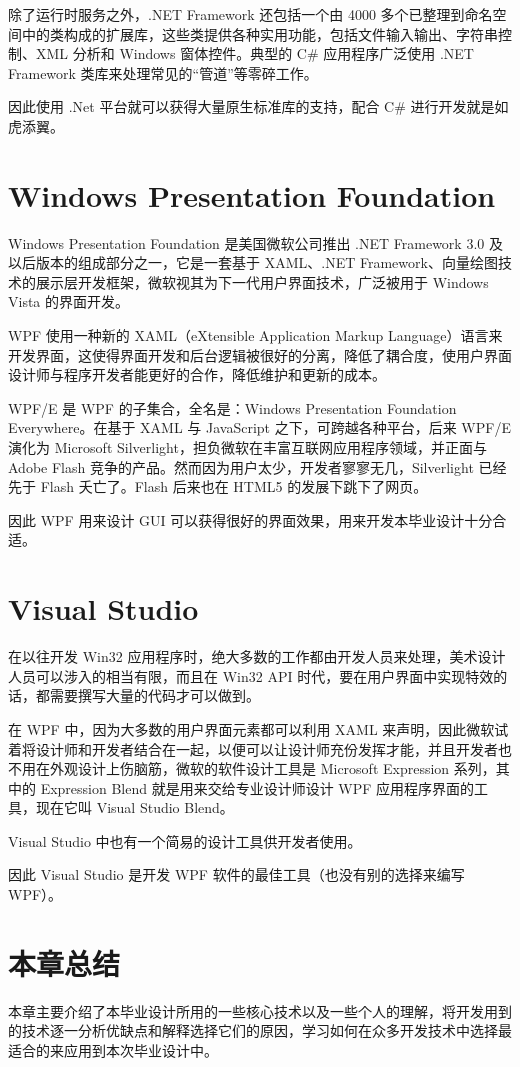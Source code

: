 除了运行时服务之外，.NET Framework 还包括一个由 4000 多个已整理到命名空间中的类构成的扩展库，这些类提供各种实用功能，包括文件输入输出、字符串控制、XML 分析和 Windows 窗体控件。典型的 C\# 应用程序广泛使用 .NET Framework 类库来处理常见的``管道''等零碎工作。

因此使用 .Net 平台就可以获得大量原生标准库的支持，配合 C\# 进行开发就是如虎添翼。

\section{Windows Presentation Foundation}

Windows Presentation Foundation 是美国微软公司推出 .NET Framework 3.0 及以后版本的组成部分之一，它是一套基于 XAML、.NET Framework、向量绘图技术的展示层开发框架，微软视其为下一代用户界面技术，广泛被用于 Windows Vista 的界面开发。

WPF 使用一种新的 XAML（eXtensible Application Markup Language）语言来开发界面，这使得界面开发和后台逻辑被很好的分离，降低了耦合度，使用户界面设计师与程序开发者能更好的合作，降低维护和更新的成本。

WPF/E 是 WPF 的子集合，全名是：Windows Presentation Foundation Everywhere。在基于 XAML 与 JavaScript 之下，可跨越各种平台，后来 WPF/E 演化为 Microsoft Silverlight，担负微软在丰富互联网应用程序领域，并正面与 Adobe Flash 竞争的产品。然而因为用户太少，开发者寥寥无几，Silverlight 已经先于 Flash 夭亡了。Flash 后来也在 HTML5 的发展下跳下了网页。

因此 WPF 用来设计 GUI 可以获得很好的界面效果，用来开发本毕业设计十分合适。

\section{Visual Studio}

在以往开发 Win32 应用程序时，绝大多数的工作都由开发人员来处理，美术设计人员可以涉入的相当有限，而且在 Win32 API 时代，要在用户界面中实现特效的话，都需要撰写大量的代码才可以做到。

在 WPF 中，因为大多数的用户界面元素都可以利用 XAML 来声明，因此微软试着将设计师和开发者结合在一起，以便可以让设计师充份发挥才能，并且开发者也不用在外观设计上伤脑筋，微软的软件设计工具是 Microsoft Expression 系列，其中的 Expression Blend 就是用来交给专业设计师设计 WPF 应用程序界面的工具，现在它叫 Visual Studio Blend。

Visual Studio 中也有一个简易的设计工具供开发者使用。

因此 Visual Studio 是开发 WPF 软件的最佳工具（也没有别的选择来编写 WPF）。

\section{本章总结}

本章主要介绍了本毕业设计所用的一些核心技术以及一些个人的理解，将开发用到的技术逐一分析优缺点和解释选择它们的原因，学习如何在众多开发技术中选择最适合的来应用到本次毕业设计中。
